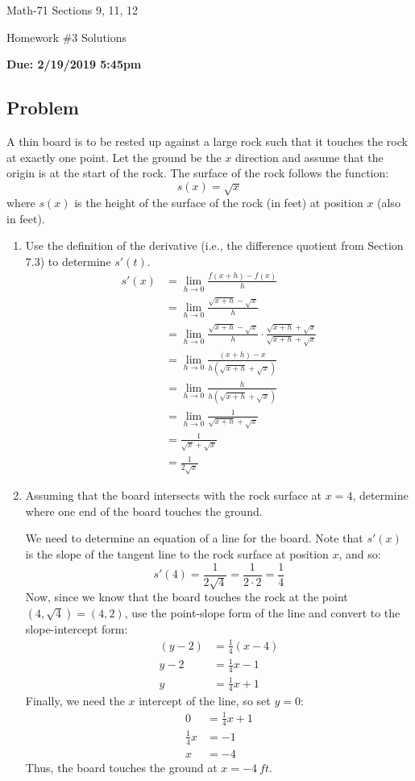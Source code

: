 \documentclass[letterpaper,12pt,fleqn]{article}
\begin{document}
\begin{center}
  \large
  Math-71 Sections 9, 11, 12

  \Large
  Homework \#3 Solutions

  \large
  \textbf{Due: 2/19/2019 5:45pm}
\end{center}

\subsection*{Problem}

A thin board is to be rested up against a large rock such that it touches the rock at exactly one point.  Let the ground be the
\(x\) direction and assume that the origin is at the start of the rock.  The surface of the rock follows the function:
\[s(x)=\sqrt{x}\]
where \(s(x)\) is the height of the surface of the rock (in feet) at position \(x\) (also in feet).
\begin{enumerate}
\item Use the definition of the derivative (i.e., the difference quotient from Section 7.3) to determine \(s'(t)\).
  \begin{align*}
    s'(x) &= \lim_{h\to0}\frac{f(x+h)-f(x)}{h} \\
    &= \lim_{h\to0}\frac{\sqrt{x+h}-\sqrt{x}}{h} \\
    &= \lim_{h\to0}\frac{\sqrt{x+h}-\sqrt{x}}{h}\cdot\frac{\sqrt{x+h}+\sqrt{x}}{\sqrt{x+h}+\sqrt{x}} \\
    &= \lim_{h\to0}\frac{(x+h)-x}{h\left(\sqrt{x+h}+\sqrt{x}\right)} \\
    &= \lim_{h\to0}\frac{h}{h\left(\sqrt{x+h}+\sqrt{x}\right)} \\
    &= \lim_{h\to0}\frac{1}{\sqrt{x+h}+\sqrt{x}} \\
    &= \frac{1}{\sqrt{x}+\sqrt{x}} \\
    &= \frac{1}{2\sqrt{x}}
  \end{align*}
  
\item Assuming that the board intersects with the rock surface at \(x=4\), determine where one end of the board touches the
  ground.

  We need to determine an equation of a line for the board.  Note that \(s'(x)\) is the slope of the tangent line to the
  rock surface at position \(x\), and so:
  \[s'(4)=\frac{1}{2\sqrt{4}}=\frac{1}{2\cdot2}=\frac{1}{4}\]
  Now, since we know that the board touches the rock at the point \((4,\sqrt{4})=(4,2)\), use the point-slope form of the
  line and convert to the slope-intercept form:
  \begin{align*}
    (y-2) &= \frac{1}{4}(x-4) \\
    y-2 &= \frac{1}{4}x-1 \\
    y &= \frac{1}{4}x+1
  \end{align*}
  Finally, we need the \(x\) intercept of the line, so set \(y=0\):
  \begin{align*}
    0 &= \frac{1}{4}x+1 \\
    \frac{1}{4}x &= -1 \\
    x &= -4
  \end{align*}
  Thus, the board touches the ground at \(x=\SI{-4}{ft}\).
\end{enumerate}
\end{document}
